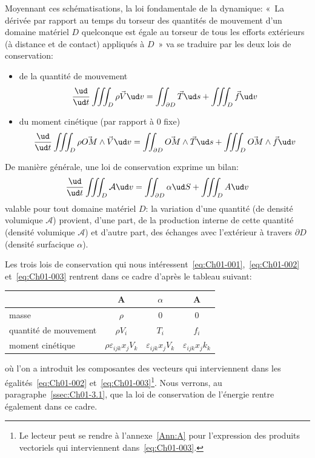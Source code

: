Moyennant ces schématisations, la loi fondamentale de la dynamique: «~La dérivée par rapport au temps du torseur des quantités de mouvement d'un domaine matériel $D$ quelconque est égale au torseur de tous les efforts extérieurs (à distance et de contact) appliqués à $D$~» va se traduire par les deux lois de conservation:
\begin{itemize}
    \item de la quantité de mouvement
        \begin{equation}
            \frac{\ud}{\ud t}\iiint_D \rho\vec{V} \ud v =\iint_{\partial D}\vec{T}\ud s+\iiint_D\vec{f}\ud v
            \label{eq:Ch01-002}
        \end{equation}
    \item du moment cinétique (par rapport à 0 fixe)
        \begin{equation}
            \frac{\ud}{\ud t}\iiint_D \rho\vec{OM}\wedge\vec{V} \ud v =\iint_{\partial D}\vec{OM}\wedge\vec{T}\ud s+\iiint_D\vec{OM}\wedge\vec{f}\ud v
            \label{eq:Ch01-003}
        \end{equation}
\end{itemize}
De manière générale, une loi de conservation exprime un bilan:
\begin{equation}
    \frac{\ud}{\ud t}\iiint_D \mathcal{A} \ud v =\iint_{\partial D}\alpha\ud S +\iiint_D A\ud v
    \label{eq:Ch01-004}
\end{equation}
valable pour tout domaine matériel $D$: la variation d'une quantité (de densité volumique $\mathcal{A}$) provient, d'une part, de la production interne de cette quantité (densité volumique $\mathcal{A}$) et d'autre part, des échanges avec l'extérieur à travers $\partial D$ (densité surfacique $\alpha$).

Les trois lois de conservation qui nous intéressent~\eqref{eq:Ch01-001},~\eqref{eq:Ch01-002} et~\eqref{eq:Ch01-003} rentrent dans ce cadre d'après le tableau suivant:
\begin{table}[h]\centering
    \begin{tabular}{l|c|c|c|}
        & A & $\alpha$ & A \\\hline
        masse & $\rho$ & 0 & 0\\\hline
        quantité de mouvement & $\rho V_i$ & $T_i$ & $f_i$ \\\hline
        moment cinétique & $\rho \varepsilon_{ijk}x_j V_k$ & $\varepsilon_{ijk}x_j V_k$ & $\varepsilon_{ijk}x_j k_k$
    \end{tabular}
\end{table}
où l'on a introduit les composantes des vecteurs qui interviennent dans les égalités~\eqref{eq:Ch01-002} et~\eqref{eq:Ch01-003}\footnote{Le lecteur peut se rendre à l'annexe~\ref{Ann:A} pour l'expression des produits vectoriels qui interviennent dans~\eqref{eq:Ch01-003}.}.
Nous verrons, au paragraphe~\ref{ssec:Ch01-3.1}, que la loi de conservation de l'énergie rentre également dans ce cadre.
